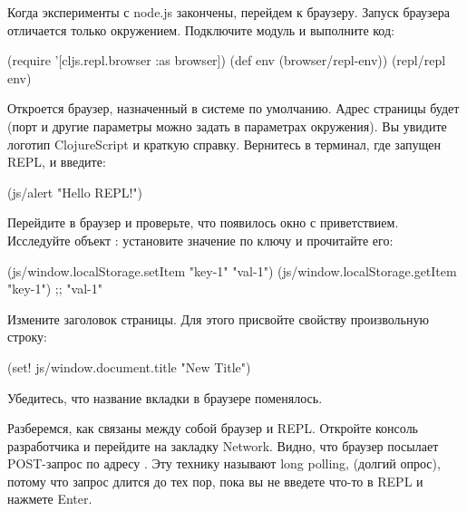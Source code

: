 Когда эксперименты с node.js закончены, перейдем к браузеру. Запуск браузера отличается только окружением. Подключите модуль  и выполните код:

\begin{english}
  \begin{clojure}
(require '[cljs.repl.browser :as browser])
(def env (browser/repl-env))
(repl/repl env)
  \end{clojure}
\end{english}

Откроется браузер, назначенный в системе по умолчанию. Адрес страницы будет  (порт и другие параметры можно задать в параметрах окружения). Вы увидите логотип ClojureScript и краткую справку. Вернитесь в терминал, где запущен REPL, и введите:

\begin{english}
  \begin{clojure}
(js/alert "Hello REPL!")
  \end{clojure}
\end{english}

Перейдите в браузер и проверьте, что появилось окно с приветствием. Исследуйте объект : установите значение по ключу и прочитайте его:

\begin{english}
  \begin{clojure}
(js/window.localStorage.setItem "key-1" "val-1")
(js/window.localStorage.getItem "key-1")
;; "val-1"
  \end{clojure}
\end{english}

Измените заголовок страницы. Для этого присвойте свойству  произвольную строку:

\begin{english}
  \begin{clojure}
(set! js/window.document.title "New Title")
  \end{clojure}
\end{english}

Убедитесь, что название вкладки в браузере поменялось.

Разберемся, как связаны между собой браузер и REPL. Откройте консоль разработчика и перейдите на закладку Network. Видно, что браузер посылает POST-запрос по адресу . Эту технику называют long polling, (долгий опрос), потому что запрос длится до тех пор, пока вы не введете что-то в REPL и нажмете Enter.

